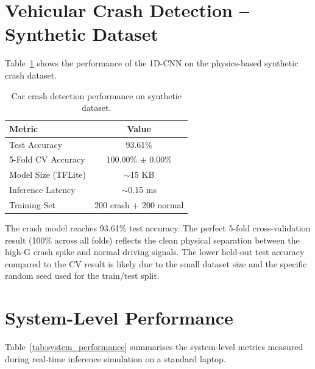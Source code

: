 \section{Vehicular Crash Detection -- Synthetic Dataset}
\label{sec:results_crash}

Table~\ref{tab:crash_model} shows the performance of the 1D-CNN on the physics-based synthetic crash dataset.

\begin{table}[h!]
    \centering
    \renewcommand{\arraystretch}{1.3}
    \caption{Car crash detection performance on synthetic dataset.}
    \label{tab:crash_model}
    \begin{tabular}{|l|c|}
        \hline
        \textbf{Metric} & \textbf{Value} \\ \hline
        Test Accuracy & 93.61\% \\ \hline
        5-Fold CV Accuracy & 100.00\% $\pm$ 0.00\% \\ \hline
        Model Size (TFLite) & $\sim$15 KB \\ \hline
        Inference Latency & $\sim$0.15 ms \\ \hline
        Training Set & 200 crash + 200 normal \\ \hline
    \end{tabular}
\end{table}

The crash model reaches 93.61\% test accuracy. The perfect 5-fold cross-validation result (100\% across all folds) reflects the clean physical separation between the high-G crash spike and normal driving signals. The lower held-out test accuracy compared to the CV result is likely due to the small dataset size and the specific random seed used for the train/test split.

\section{System-Level Performance}
\label{sec:results_system}

Table~\ref{tab:system_performance} summarises the system-level metrics measured during real-time inference simulation on a standard laptop.

